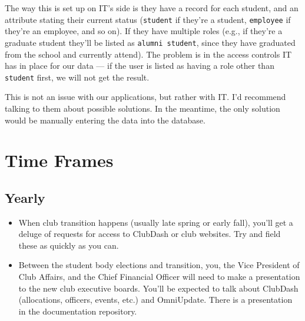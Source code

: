 \documentclass[11pt]{report}
\begin{document}
		The way this is set up on IT's side is they have a record for each student, and an attribute stating their current status (\texttt{student} if they're a student, \texttt{employee} if they're an employee, and so on). If they have multiple roles (e.g., if they're a graduate student they'll be listed as \texttt{alumni student}, since they have graduated from the school and currently attend). The problem is in the access controls IT has in place for our data --- if the user is listed as having a role other than \texttt{student} first, we will not get the result.
	
		This is not an issue with our applications, but rather with IT. I'd recommend talking to them about possible solutions. In the meantime, the only solution would be manually entering the data into the database.


\chapter{Time Frames}

	\section{Yearly}
		\begin{itemize}
			\item{When club transition happens (usually late spring or early fall), you'll get a deluge of requests for access to ClubDash or club websites. Try and field these as quickly as you can.}
			\item{Between the student body elections and transition, you, the Vice President of Club Affairs, and the Chief Financial Officer will need to make a presentation to the new club executive boards. You'll be expected to talk about ClubDash (allocations, officers, events, etc.) and OmniUpdate. There is a presentation in the documentation repository.}	
		\end{itemize}
\end{document}
